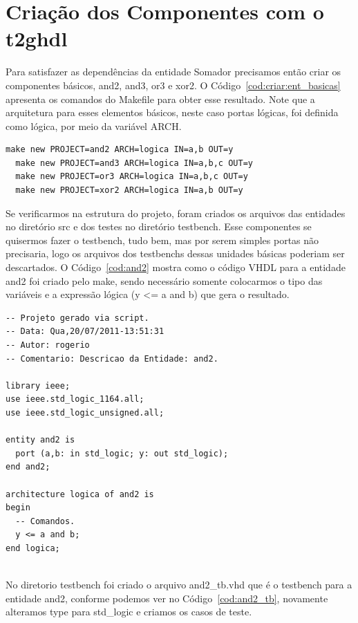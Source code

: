 \documentclass[a4paper,10pt]{report}
\begin{document}
\section{Criação dos Componentes com o t2ghdl}

Para satisfazer as dependências da entidade Somador precisamos então criar os componentes básicos, and2, and3, or3 e xor2. O Código~\ref{cod:criar:ent_basicas} apresenta os comandos do Makefile para obter esse resultado. Note que a arquitetura para esses elementos básicos, neste caso portas lógicas, foi definida como lógica, por meio da variável ARCH.

\lstset{numbers=left, numberstyle=\tiny, stepnumber=1, numbersep=3pt}
\begin{lstlisting}[label=cod:criar:ent_basicas,caption=Comandos para a criação das entidades básicas]
  make new PROJECT=and2 ARCH=logica IN=a,b OUT=y
  make new PROJECT=and3 ARCH=logica IN=a,b,c OUT=y
  make new PROJECT=or3 ARCH=logica IN=a,b,c OUT=y
  make new PROJECT=xor2 ARCH=logica IN=a,b OUT=y
\end{lstlisting}

Se verificarmos na estrutura do projeto, foram criados os arquivos das entidades no diretório src e dos testes no diretório testbench. Esse componentes se quisermos fazer o testbench, tudo bem, mas por serem simples portas não precisaria, logo os arquivos dos testbenchs dessas unidades básicas poderiam ser descartados.
O Código~\ref{cod:and2} mostra como o código VHDL para a entidade and2 foi criado pelo make, sendo necessário somente colocarmos o tipo das variáveis e a expressão lógica (y <= a and b) que gera o resultado.

\lstset{language=VHDL}
\lstset{numbers=left, numberstyle=\tiny, stepnumber=1, numbersep=3pt}
\begin{lstlisting}[label=cod:and2,caption=Código VHDL da entidade and2]
-- Projeto gerado via script.
-- Data: Qua,20/07/2011-13:51:31
-- Autor: rogerio
-- Comentario: Descricao da Entidade: and2.
 
library ieee;
use ieee.std_logic_1164.all;
use ieee.std_logic_unsigned.all;
 
entity and2 is
  port (a,b: in std_logic; y: out std_logic);
end and2;
 
architecture logica of and2 is
begin
  -- Comandos.
  y <= a and b;
end logica;
 
\end{lstlisting}

No diretorio testbench foi criado o arquivo and2\_tb.vhd que é o testbench para a entidade and2, conforme podemos ver no Código~\ref{cod:and2_tb}, novamente alteramos type para std\_logic e criamos os casos de teste.
\end{document}
